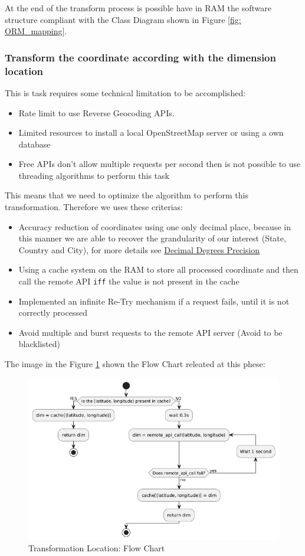 \documentclass[conference]{IEEEtran}
\begin{document}
	At the end of the transform process is possible have in RAM the software structure compliant with the Class Diagram shown in Figure \ref{fig: ORM_mapping}.\\
	
	
	\subsubsection{Transform the coordinate according with the dimension location}
	This is task requires some technical limitation to be accomplished:
	\begin{itemize}
		\item Rate limit to use Reverse Geocoding APIs.
		\item Limited resources to install a local OpenStreetMap server or using a own database
		\item Free APIs don't allow multiple requests per second then is not possible to use threading algorithms to perform this task
	\end{itemize}
	
	This means that we need to optimize the algorithm to perform this transformation. Therefore we uses these criterias:
	\begin{itemize}
		\item Accuracy reduction of coordinates using one only decimal place, because in this manner we are able to recover the grandularity of our interest (State, Country and City), for more details see \href{https://en.wikipedia.org/wiki/Decimal_degrees#Precision}{Decimal Degrees Precision}
		\item Using a cache system on the RAM to store all processed coordinate and then call the remote API \texttt{iff} the value is not present in the cache
		\item Implemented an infinite Re-Try mechanism if a request fails, until it is not correctly processed
		\item Avoid multiple and burst requests to the remote API server (Avoid to be blacklisted) 
	\end{itemize}
	The image in the Figure \ref{fig:flow_diagram_tranform_location} shown the Flow Chart releated at this phese:
	\begin{figure}[htpb]
		\centering
		\includegraphics[width=\columnwidth]{images/flow_diagram_tranform_location.png}
		\caption{Transformation Location: Flow Chart}
		\label{fig:flow_diagram_tranform_location}
	\end{figure}
	
\end{document}
